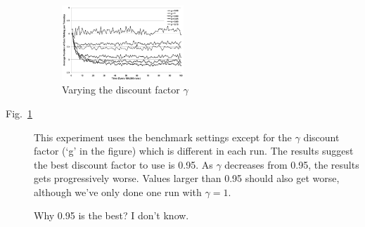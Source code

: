 \begin{description}
\begin{figure}
\centering
\includegraphics[width=0.45\textwidth]{discountFactor}
\caption{Varying the discount factor $\gamma$}\label{f:discountFactor}
\end{figure}

\item[Fig.~\ref{f:discountFactor}]
This experiment uses the benchmark settings except for the $\gamma$
discount factor (`g' in the figure) which is different in each run.
The results suggest the best discount factor to use is 0.95. As
$\gamma$ decreases from 0.95, the results gets progressively worse.
Values larger than 0.95 should also get worse, although we've only
done one run with $\gamma = 1$.

Why 0.95 is the best? I don't know.

\end{description}

